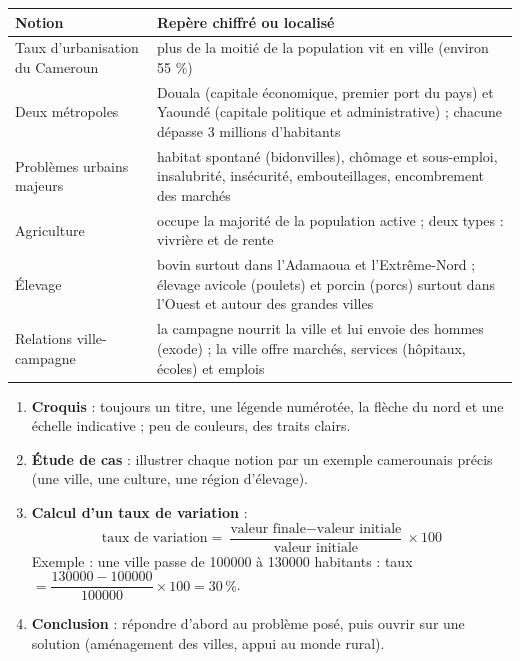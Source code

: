 \documentclass[11pt]{article}
\begin{document}
\begin{aretenir}
\begin{center}
\begin{tabularx}{\linewidth}{|l|X|}\hline
\rowcolor{popblueL} \textbf{Notion} & \textbf{Repère chiffré ou localisé} \\ \hline
Taux d'urbanisation du Cameroun & plus de la moitié de la population vit en ville (environ 55 \%) \\ \hline
Deux métropoles & Douala (capitale économique, premier port du pays) et Yaoundé (capitale politique et administrative) ; chacune dépasse 3 millions d'habitants \\ \hline
Problèmes urbains majeurs & habitat spontané (bidonvilles), chômage et sous-emploi, insalubrité, insécurité, embouteillages, encombrement des marchés \\ \hline
Agriculture & occupe la majorité de la population active ; deux types : vivrière et de rente \\ \hline
Élevage & bovin surtout dans l'Adamaoua et l'Extrême-Nord ; élevage avicole (poulets) et porcin (porcs) surtout dans l'Ouest et autour des grandes villes \\ \hline
Relations ville-campagne & la campagne nourrit la ville et lui envoie des hommes (exode) ; la ville offre marchés, services (hôpitaux, écoles) et emplois \\ \hline
\end{tabularx}
\end{center}
\end{aretenir}

\begin{methode}
\begin{enumerate}
  \item \textbf{Croquis} : toujours un titre, une légende numérotée, la flèche du nord et une échelle indicative ; peu de couleurs, des traits clairs.
  \item \textbf{Étude de cas} : illustrer chaque notion par un exemple camerounais précis (une ville, une culture, une région d'élevage).
  \item \textbf{Calcul d'un taux de variation} :
  \[ \text{taux de variation} = \frac{\text{valeur finale} - \text{valeur initiale}}{\text{valeur initiale}} \times 100 \]
  Exemple : une ville passe de \num{100000} à \num{130000} habitants : taux $= \dfrac{130000 - 100000}{100000} \times 100 = 30\,\%$.
  \item \textbf{Conclusion} : répondre d'abord au problème posé, puis ouvrir sur une solution (aménagement des villes, appui au monde rural).
\end{enumerate}
\end{methode}
\end{document}
